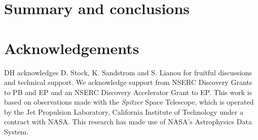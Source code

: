 \documentclass[useAMS,usenatbib,a4paper]{mn2e}
\begin{document}


\section{Summary and conclusions}



\section*{Acknowledgements}


DH acknowledges D. Stock, K. Sandstrom and S. Lianou for fruitful discussions and technical support. 
We acknowledge support from NSERC Discovery Grants to PB and EP and an NSERC Discovery Accelerator Grant to EP. 
This work is based on observations made with the {\em Spitzer} Space Telescope, which is operated by the 
Jet Propulsion Laboratory, California Institute of Technology under a contract with NASA.
This research has made use of NASA's Astrophysics Data System.




{}

\bsp

\label{lastpage}
\end{document}
